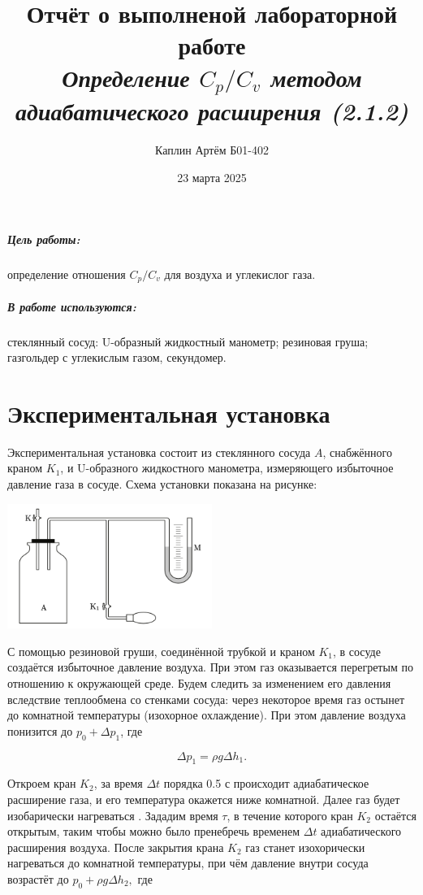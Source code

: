 \documentclass[a4paper,12pt]{article}
\title{\textbf{Отчёт о выполненой лабораторной работе \\ \textit{Определение $C_p / C_v$ методом адиабатического расширения (2.1.2)}}}
\author{Каплин Артём Б01-402}
\date{23 марта 2025}
\begin{document}
\maketitle

\subparagraph*{Цель работы:}определение отношения $C_p / C_v$ для воздуха и углекислог газа.
\subparagraph*{В работе используются:}стеклянный сосуд: U-образный жидкостный манометр; резиновая груша; газгольдер с углекислым газом, секундомер. 

\section{Экспериментальная установка}

Экспериментальная установка состоит из стеклянного сосуда $A$, снабжённого краном $K_1$, и U-образного жидкостного манометра, измеряющего избыточное давление газа в сосуде. Схема установки показана на рисунке:

\begin{center}
    \includegraphics[width=0.5\textwidth]{ust.jpg}
\end{center}

С помощью резиновой груши, соединённой трубкой и краном $K_1$, в сосуде создаётся избыточное давление воздуха. При этом газ оказывается перегретым по отношению к окружающей среде. Будем следить за изменением его давления вследствие теплообмена со стенками сосуда: через некоторое время газ остынет до комнатной температуры (изохорное охлаждение). При этом давление воздуха понизится до $p_0 + \Delta p_1$, где

\begin{equation}
    \Delta p_1 = \rho g \Delta h_1.
\end{equation}

Откроем кран $K_2$, за время $\Delta t$ порядка 0.5 с происходит адиабатическое расширение газа, и его температура окажется ниже комнатной. Далее газ будет изобарически нагреваться . Зададим время $\tau$, в течение которого кран $K_2$ остаётся открытым, таким чтобы можно было пренебречь временем $\Delta t$ адиабатического расширения воздуха. После закрытия крана $K_2$ газ станет изохорически нагреваться до комнатной температуры, при чём давление внутри сосуда возрастёт до $p_0 + \rho g \Delta h_2,$ где
\end{document}
